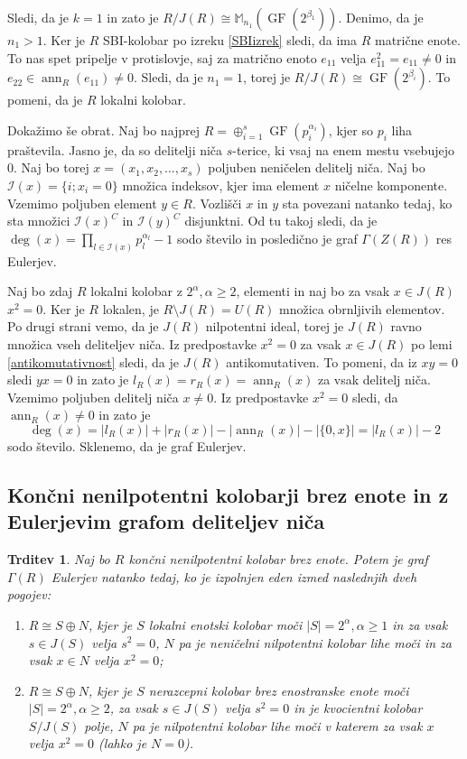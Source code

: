\documentclass[a4paper, 12pt]{amsart}
\theoremstyle{definition} %
\theoremstyle{plain} %
\newtheorem{trditev}[definicija]{Trditev}
\newcommand{\M}{\mathbb M}
\DeclareMathOperator{\ann}{ann}
\DeclareMathOperator{\GF}{GF}
\begin{document}
Sledi, da je $k=1$ in zato je $R/J(R) \cong \M_{n_1}(\GF(2^{\beta_1}))$. Denimo, da je $n_1 > 1$. Ker je $R$ SBI-kolobar po izreku \ref{SBIizrek} sledi, da ima $R$ matrične enote. To nas spet pripelje v protislovje, saj za matrično enoto $e_{11}$ velja $e_{11}^2 = e_{11} \neq 0$ in $e_{22}\in \ann_R(e_{11}) \neq 0$. Sledi, da je $n_1 = 1$, torej je $R/J(R) \cong \GF(2^{\beta_i})$. To pomeni, da je $R$  lokalni kolobar.

Dokažimo še obrat. Naj bo najprej $R= \oplus_{i=1}^s \GF(p_i^{\alpha_i})$, kjer so $p_i$ liha praštevila. Jasno je, da so delitelji niča $s$-terice, ki vsaj na enem mestu vsebujejo 0. Naj bo torej $x=(x_1,x_2,\dots,x_s)$ poljuben neničelen delitelj  niča. Naj bo $\mathcal{I}(x)=\{i;x_i=0\}$ množica indeksov, kjer ima element $x$ ničelne komponente. Vzemimo poljuben element $y\in R$. Vozlišči $x$ in $y$ sta povezani natanko tedaj, ko sta množici $\mathcal{I}(x)^C$ in $\mathcal{I}(y)^C$ disjunktni. Od tu takoj sledi, da je $\deg(x) = \prod_{l\in \mathcal{I}(x)} p_l^{\alpha_l}-1$ sodo število in posledično je graf $\Gamma(Z(R))$ res Eulerjev.

Naj bo zdaj $R$ lokalni kolobar z $2^\alpha, \alpha \ge 2$, elementi in naj bo za vsak $x\in J(R)$ $ x^2 = 0$. Ker je $R$ lokalen,  je $R\setminus J(R)=U(R)$ množica obrnljivih elementov. Po drugi strani vemo, da je $J(R)$ nilpotentni ideal, torej je $J(R)$ ravno množica vseh deliteljev niča. Iz predpostavke $x^2 = 0$ za vsak $x\in J(R)$ po lemi \ref{antikomutativnost} sledi, da je $J(R)$ antikomutativen. To pomeni, da iz $xy = 0$ sledi $yx=0$ in zato je $l_R(x) = r_R(x) = \ann_R(x)$ za vsak delitelj niča. Vzemimo poljuben delitelj niča $x\neq 0$. Iz predpostavke $x^2 = 0$ sledi, da $\ann_R(x)\neq 0$ in zato je 
$$
\deg(x) = |l_R(x)| + |r_R(x)| -| \ann_R(x) | - |\{0,x\}| = |l_R(x)| -2 
$$
sodo število. Sklenemo, da je graf Eulerjev. 
\endproof

\subsection{Končni nenilpotentni kolobarji brez enote in z Eulerjevim grafom deliteljev niča}

\begin{trditev}
\label{EulerBrezEnote}
Naj bo $R$ končni nenilpotentni kolobar brez enote. Potem je graf $\Gamma(R)$ Eulerjev natanko tedaj, ko je izpolnjen eden izmed naslednjih dveh pogojev:
\begin{enumerate}
\item $R\cong S \oplus N$, kjer je $S$ lokalni enotski kolobar moči $|S| = 2^{\alpha}, \alpha \ge 1$ in za vsak $s\in J(S)$ velja $s^2 = 0$, $N$ pa je neničelni nilpotentni kolobar lihe moči in za vsak $x\in N$ velja $x^2 = 0$;
\item $R\cong S\oplus N$, kjer je $S$ nerazcepni kolobar brez enostranske enote moči $|S| = 2^{\alpha}, \alpha\ge 2$, za vsak $s\in J(S)$ velja $s^2 = 0$ in je kvocientni kolobar $S/J(S)$ polje, $N$ pa je nilpotentni kolobar lihe moči v katerem za vsak $x$ velja $x^2 =0 $ (lahko je $N=0$). 
\end{enumerate}
\end{trditev}
\end{document}
